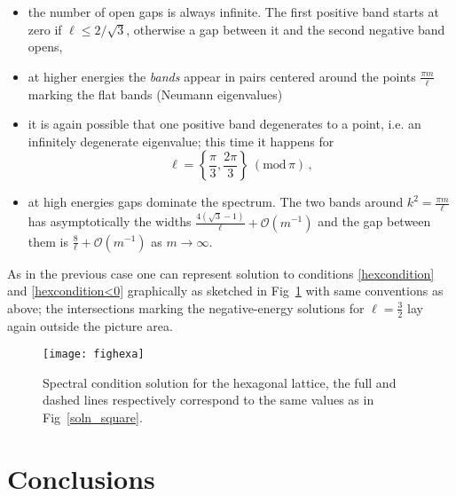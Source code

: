 \documentclass[english]{elsarticle}
\begin{document}
\begin{itemize}

\item

the number of open gaps is always infinite. The first positive band
starts at zero if $\ell\le 2/\sqrt{3}$, otherwise a gap between it
and the second negative band opens,

\item at higher energies the \emph{bands} appear in pairs centered around the points $\frac{\pi m}{\ell}\:$ marking the flat bands (Neumann eigenvalues)

\item it is again possible that one positive band degenerates to a point, i.e. an infinitely degenerate eigenvalue; this time it happens for
$$
\ell = \left\{ \frac{\pi}{3}, \frac{2\pi}{3}\right\} \:
(\mathrm{mod} \,\pi)\,,
$$

\item at high energies gaps dominate the spectrum. The two bands around $k^2= \frac{\pi m}{\ell}$ has asymptotically the widths $\frac{4(\sqrt{3}-1)}{\ell} + \mathcal{O}(m^{-1})$ and the gap between them is $\frac{8}{\ell} + \mathcal{O}(m^{-1})$ as $m\to \infty$.

\end{itemize}

\noindent As in the previous case one can represent solution to
conditions \eqref{hexcondition} and \eqref{hexcondition<0}
graphically as sketched in Fig~\ref{soln_hexa} with same conventions
as above; the intersections marking the negative-energy solutions
for $\ell=\frac32$ lay again outside the picture area.
\begin{figure}[htbp]
     \centering
     \texttt{[image: fighexa]}
     \caption{Spectral condition solution for the hexagonal lattice, the full and dashed lines respectively correspond to the same values as in Fig~\ref{soln_square}.}\label{soln_hexa}
\end{figure}

\section{Conclusions} %
\end{document}
